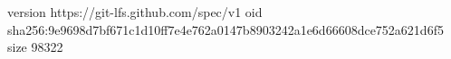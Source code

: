version https://git-lfs.github.com/spec/v1
oid sha256:9e9698d7bf671c1d10ff7e4e762a0147b8903242a1e6d66608dce752a621d6f5
size 98322

